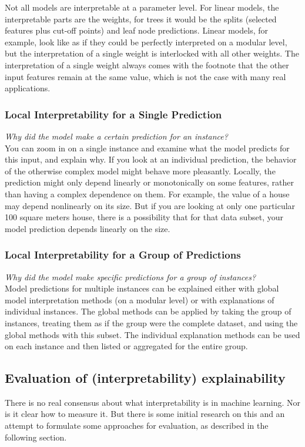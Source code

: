 Not all models are interpretable at a parameter level. For linear models, the interpretable parts are the weights, 
for trees it would be the splits (selected features plus cut-off points) and leaf node predictions. Linear models, 
for example, look like as if they could be perfectly interpreted on a modular level, but the interpretation of a single 
weight is interlocked with all other weights. The interpretation of a single weight always comes with the footnote that 
the other input features remain at the same value, which is not the case with many real applications.

\newpage
\subsubsection{Local Interpretability for a Single Prediction}
\textit{Why did the model make a certain prediction for an instance?}\\

You can zoom in on a single instance and examine what the model predicts for this input, and explain why. If you look at an 
individual prediction, the behavior of the otherwise complex model might behave more pleasantly. Locally, the prediction 
might only depend linearly or monotonically on some features, rather than having a complex dependence on them. For example, 
the value of a house may depend nonlinearly on its size. But if you are looking at only one particular 100 square meters house, 
there is a possibility that for that data subset, your model prediction depends linearly on the size.

\subsubsection{Local Interpretability for a Group of Predictions}
\textit{Why did the model make specific predictions for a group of instances?}\\

Model predictions for multiple instances can be explained either with global model interpretation methods 
(on a modular level) or with explanations of individual instances. The global methods can be applied by taking the group of instances, 
treating them as if the group were the complete dataset, and using the global methods with this subset. The individual explanation methods can be used 
on each instance and then listed or aggregated for the entire group.

\subsection{Evaluation of (interpretability) explainability}
There is no real consensus about what interpretability is in machine learning. Nor is it clear how to measure it. But there is some initial research on 
this and an attempt to formulate some approaches for evaluation, as described in the following section.\\

